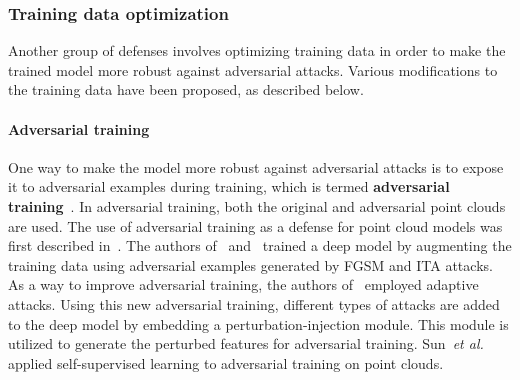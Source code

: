 \documentclass{ieeeaccess}
\def\etal{\textit{et al.}}
\begin{document}
\subsubsection{Training data optimization}
\label{sec:Data optimization}

Another group of defenses involves optimizing training data in order to make the trained model more robust against adversarial attacks. Various modifications to the training data have been proposed, as described below. %


\paragraph{Adversarial training}
\label{sec:Adversarial Training}
One way to make the model more robust against adversarial attacks is to expose it to adversarial examples during training, which is termed %
\textbf{adversarial training}~\cite{goodfellow2015explaining}. %
In adversarial training, both the original and adversarial point clouds are used. The use of adversarial training as a defense for point cloud models was first described in~\cite{liu2019extending}.  The authors of~\cite{liu2019extending} and~\cite{liu2022imperceptible} trained a deep model by augmenting the training data using adversarial examples generated by FGSM and ITA attacks. 
As a way to improve adversarial training, the authors of~\cite{liang2022pagn} employed adaptive attacks. Using this new adversarial training, different types of attacks are added to the deep model by embedding a perturbation-injection module. This module is utilized to generate the perturbed features for adversarial training. Sun~\etal~\cite{sun2021adversarially} applied self-supervised learning to adversarial training on point clouds.
 
\end{document}
